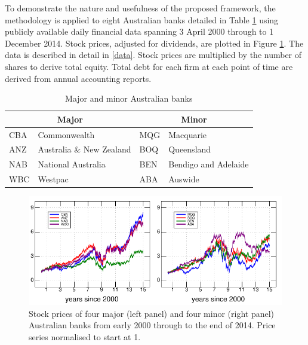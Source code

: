 \documentclass[authoryear]{elsarticle}
\newcommand{\fref}[1]{Figure \ref{#1}}
\newcommand{\tref}[1]{Table \ref{#1}}
\newcommand{\aref}[1]{\ref{#1}}
\begin{document}
To demonstrate the nature and usefulness of the proposed framework, the methodology is applied to eight Australian banks detailed in \tref{eightbanks} using publicly available daily financial data spanning 3 April 2000 through to 1 December 2014.  Stock prices, adjusted for dividends, are plotted in \fref{prices}.  The data is described in detail in \aref{data}.  Stock prices are multiplied by the number of shares to derive total equity. Total debt for each firm at each point of time are derived from annual accounting reports.

\begin{table}[htbp]
\label{banks}\caption{Major and minor Australian banks}\label{eightbanks}
\begin{center}
\begin{tabular}{l|l||l|l}
\hline
 \multicolumn{2}{c||}{Major}& \multicolumn{2}{c}{Minor}\\
 \hline
CBA & Commonwealth   & MQG  & Macquarie \\
ANZ  & Australia \& New Zealand  & BOQ  &  Queensland\\
NAB  & National Australia  & BEN & Bendigo and Adelaide \\
WBC  & Westpac & ABA & Auswide \\
\hline
\end{tabular}
\end{center}
\end{table}

\begin{figure}[htbp]
\begin{center}
\includegraphics{figures/prices.pdf}
\caption{Stock  prices of four major (left panel) and four minor (right panel) Australian banks from early 2000 through to the end of 2014.  Price series normalised to start at 1.}
\label{prices}
\end{center}
\end{figure}
\end{document}
